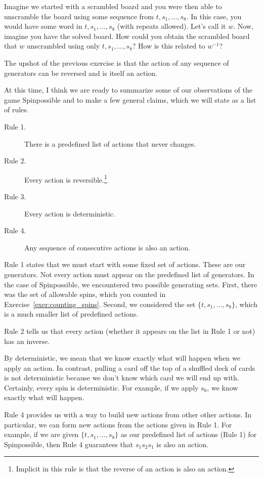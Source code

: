 \begin{exercise}
Imagine we started with a scrambled board and you were then able to unscramble the board using some sequence from $t, s_1, \ldots, s_8$.  In this case, you would have some word in $t, s_1, \ldots, s_8$ (with repeats allowed). Let's call it $w$.  Now, imagine you have the solved board.  How could you obtain the scrambled board that $w$ unscrambled using only $t, s_1,\ldots, s_8$? How is this related to $w^{-1}$?
\end{exercise}

The upshot of the previous exercise is that the action of any sequence of generators can be reversed and is itself an action.

At this time, I think we are ready to summarize some of our observations of the game Spinpossible and to make a few general claims, which we will state as a list of rules.

\begin{description}
\item[Rule 1.] There is a predefined list of actions that never changes.
\item[Rule 2.] Every action is reversible.\footnote{Implicit in this rule is that the reverse of an action is also an action.}
\item[Rule 3.] Every action is deterministic.
\item[Rule 4.] Any sequence of consecutive actions is also an action.
\end{description}

Rule 1 states that we must start with some fixed set of actions. These are our generators.  Not every action must appear on the predefined list of generators.  In the case of Spinpossible, we encountered two possible generating sets.  First, there was the set of allowable spins, which you counted in Exercise~\ref{exer:counting_spins}.  Second, we considered the set $\{t,s_1,\ldots, s_8\}$, which is a much smaller list of predefined actions.

Rule 2 tells us that every action (whether it appears on the list in Rule 1 or not) has an inverse.

By deterministic, we mean that we know exactly what will happen when we apply an action.  In contrast, pulling a card off the top of a shuffled deck of cards is not deterministic because we don't know which card we will end up with. Certainly, every spin is deterministic. For example, if we apply $s_6$, we know exactly what will happen.

Rule 4 provides us with a way to build new actions from other other actions.  In particular, we can form new actions from the actions given in Rule 1.  For example, if we are given $\{t,s_1,\ldots, s_8\}$ as our predefined list of actions (Rule 1) for Spinpossible, then Rule 4 guarantees that $s_1 s_2 s_1$ is also an action. 

